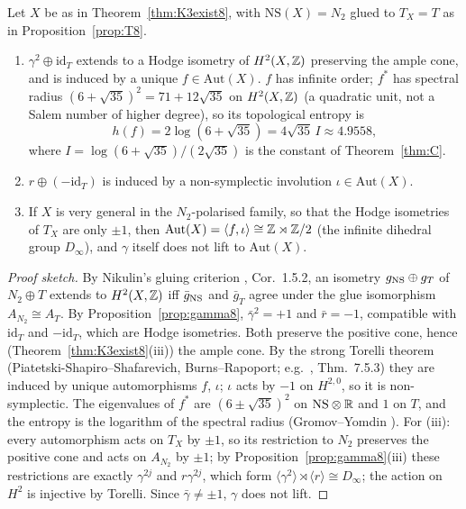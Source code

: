 \begin{theorem}\label{thm:aut8}
Let $X$ be as in Theorem~\ref{thm:K3exist8}, with $\mathrm{NS}(X)=N_2$ glued to $T_X=T$ as in Proposition~\ref{prop:T8}.
\begin{enumerate}[label=(\roman*)]
\item $\gamma^2\oplus\mathrm{id}_{T}$ extends to a Hodge isometry of $H^2(X,\mathbb{Z})$ preserving the ample cone, and is induced by a unique $f\in\mathrm{Aut}(X)$. $f$ has infinite order; $f^*$ has spectral radius $(6+\sqrt{35})^2=71+12\sqrt{35}$ on $H^2(X,\mathbb{Z})$ (a quadratic unit, not a Salem number of higher degree), so its topological entropy is
\[
h(f)=2\log(6+\sqrt{35})=4\sqrt{35}\,I\approx4.9558,
\]
where $I=\log(6+\sqrt{35})/(2\sqrt{35})$ is the constant of Theorem~\ref{thm:C}.
\item $r\oplus(-\mathrm{id}_T)$ is induced by a non-symplectic involution $\iota\in\mathrm{Aut}(X)$.
\item If $X$ is very general in the $N_2$-polarised family, so that the Hodge isometries of $T_X$ are only $\pm1$, then $\mathrm{Aut}(X)=\langle f,\iota\rangle\cong\mathbb{Z}\rtimes\mathbb{Z}/2$ (the infinite dihedral group $D_\infty$), and $\gamma$ itself does not lift to $\mathrm{Aut}(X)$.
\end{enumerate}
\end{theorem}
\begin{proof}[Proof sketch]
By Nikulin's gluing criterion \cite{Nikulin}, Cor.~1.5.2, an isometry $g_{\rm NS}\oplus g_T$ of $N_2\oplus T$ extends to $H^2(X,\mathbb{Z})$ iff $\bar g_{\rm NS}$ and $\bar g_T$ agree under the glue isomorphism $A_{N_2}\cong A_T$. By Proposition~\ref{prop:gamma8}, $\bar\gamma^2=+1$ and $\bar r=-1$, compatible with $\mathrm{id}_T$ and $-\mathrm{id}_T$, which are Hodge isometries. Both preserve the positive cone, hence (Theorem~\ref{thm:K3exist8}(iii)) the ample cone. By the strong Torelli theorem (Piatetski-Shapiro--Shafarevich, Burns--Rapoport; e.g.\ \cite{Huybrechts}, Thm.~7.5.3) they are induced by unique automorphisms $f$, $\iota$; $\iota$ acts by $-1$ on $H^{2,0}$, so it is non-symplectic. The eigenvalues of $f^*$ are $(6\pm\sqrt{35})^2$ on $\mathrm{NS}\otimes\mathbb{R}$ and $1$ on $T$, and the entropy is the logarithm of the spectral radius (Gromov--Yomdin \cite{GY}). For (iii): every automorphism acts on $T_X$ by $\pm1$, so its restriction to $N_2$ preserves the positive cone and acts on $A_{N_2}$ by $\pm1$; by Proposition~\ref{prop:gamma8}(iii) these restrictions are exactly $\gamma^{2j}$ and $r\gamma^{2j}$, which form $\langle\gamma^2\rangle\rtimes\langle r\rangle\cong D_\infty$; the action on $H^2$ is injective by Torelli. Since $\bar\gamma\neq\pm1$, $\gamma$ does not lift.
\end{proof}
